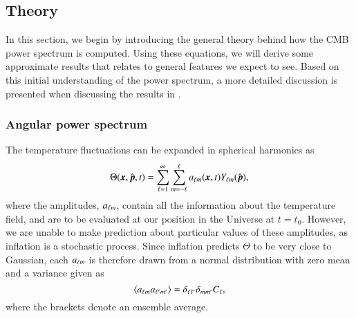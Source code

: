 \subsection{Theory}\label{ssec:M4:theory}
In this section, we begin by introducing the general theory behind how the CMB power spectrum is computed. Using these equations, we will derive some approximate results that relates to general features we expect to see. Based on this initial understanding of the power spectrum, a more detailed discussion is presented when discussing the results in .      

\subsubsection{Angular power spectrum} \label{sssec:M4:theory:angular_power_spectrum}
The temperature fluctuations can be expanded in spherical harmonics as
\begin{equation} \label{eq:M4:theory:theta_expansion_in_spherical_harmonics}
    \Theta(\boldsymbol{x}, \hat{\boldsymbol{p}}, t) = \sum_{\ell=1}^{\infty} \sum_{m=-\ell}^{\ell} a_{\ell m}(\boldsymbol{x}, t) Y_{\ell m}(\hat{\boldsymbol{p}}), 
\end{equation}
where the amplitudes, $a_{\ell m}$, contain all the information about the temperature field, and are to be evaluated at our position in the Universe at $t=t_0$. However, we are unable to make prediction about particular values of these amplitudes, as inflation is a stochastic process. Since inflation predicts $\Theta$ to be very close to Gaussian, each $a_{\ell m}$ is therefore drawn from a normal distribution with zero mean and a variance given as 
\begin{equation} \label{eq:M4:theory:variance_of_alms}
    \expval{a_{\ell m}a_{\ell' m'}} = \delta_{\ell \ell'} \delta_{m m'} C_\ell,
\end{equation} 
where the brackets denote an ensemble average. 

